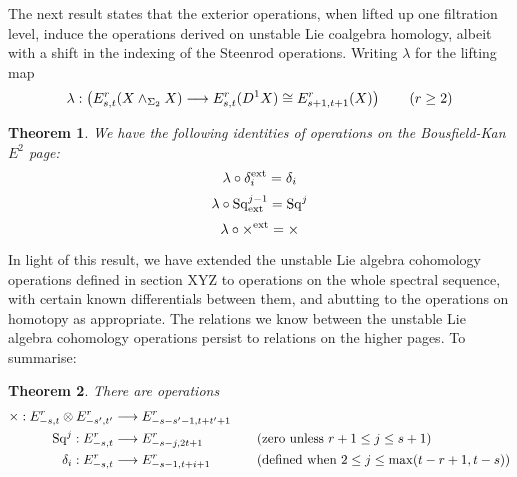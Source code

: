 \documentclass[11pt]{amsart}
\theoremstyle{plain}
\newtheorem{thm}{Theorem}[section]
\theoremstyle{definition}
\renewcommand{\to}{\longrightarrow}
\newcommand{\squishlist}{
  \setlength{\itemsep}{.5pt}
  \setlength{\parskip}{0pt}
  \setlength{\parsep}{0pt}}
\theoremstyle{plain}
\newcommand{\Sq}{\mathrm{Sq}}
\begin{document}
\begin{Operations on the Bousfield-Kan spectral sequence}
\begin{shaded}\tiny
The next result states that the exterior operations, when lifted up one filtration level, induce the operations derived on unstable Lie coalgebra homology, albeit with a shift in the indexing of the Steenrod operations. Writing $\lambda$ for the lifting map
\[\lambda:\left(E^r_{s,t}(X\wedge_{\Sigma_2}X)\to E^r_{s,t}(D^1X)\cong E^r_{s+1,t+1}(X)\right)\textup{$\qquad (r\geq2)$}\]
\begin{thm}
We have the following identities of operations on the Bousfield-Kan $E^2$ page:
\[\lambda\circ\delta_i^\textup{ext}=\delta_i\]
\[\lambda\circ\Sq^{j-1}_\textup{ext}=\Sq^j\]
\[\lambda\circ\times^\textup{ext}=\times\]
\end{thm}
In light of this result, we have extended the unstable Lie algebra cohomology operations defined in section XYZ to operations on the whole spectral sequence, with certain known differentials between them, and abutting to the operations on homotopy as appropriate. The relations we know between the unstable Lie algebra cohomology operations persist to relations on the higher pages. To summarise:
\begin{thm}
There are operations
\begin{alignat*}{2}
\times:E^r_{-s,t}\otimes E^r_{-s',t'}&\to E^r_{-s-s'-1,t+t'+1}&&\\
\Sq^j:E^r_{-s,t}&\to E^r_{-s-j,2t+1}&&\textup{\quad (zero unless $r+1\leq j\leq s+1$)}\\
\delta_i:E^r_{-s,t}&\to E^r_{-s-1,t+i+1}&&\textup{\quad (defined when $2\leq j\leq\max(t-r+1,t-s)$)}
\end{alignat*}
\end{thm}
\end{shaded}
\end{Operations on the Bousfield-Kan spectral sequence}
\end{document}
